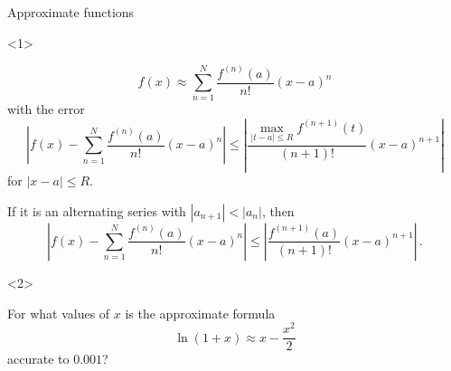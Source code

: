 \begin{frame}{Approximate functions}

\begin{onlyenv}<1>


\[
f\left(x\right)\approx\sum_{n=1}^{N}\frac{f^{\left(n\right)}\left(a\right)}{n!}\left(x-a\right)^{n}
\]
with the error
\[
\left|f\left(x\right)-\sum_{n=1}^{N}\frac{f^{\left(n\right)}\left(a\right)}{n!}\left(x-a\right)^{n}\right|\le\left|\frac{{\displaystyle \max_{\left|t-a\right|\le R}}f^{\left(n+1\right)}\left(t\right)}{\left(n+1\right)!}\left(x-a\right)^{n+1}\right|
\]
for $\left|x-a\right|\le R$.


If it is an alternating series with $\left|a_{n+1}\right|<\left|a_{n}\right|$,
then
\[
\left|f\left(x\right)-\sum_{n=1}^{N}\frac{f^{\left(n\right)}\left(a\right)}{n!}\left(x-a\right)^{n}\right|\le\left|\frac{f^{\left(n+1\right)}\left(a\right)}{\left(n+1\right)!}\left(x-a\right)^{n+1}\right|\,.
\]


\end{onlyenv}



\begin{onlyenv}<2>

\begin{example}
For what values of $x$ is the approximate formula
\[
\ln\left(1+x\right)\approx x-\frac{x^{2}}{2}
\]
accurate to $0.001$?\end{example}

\end{onlyenv}

\end{frame}



